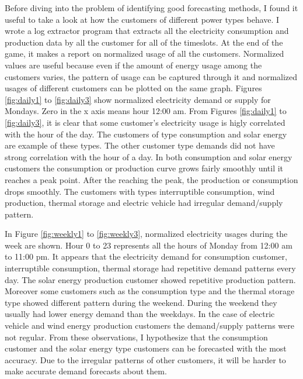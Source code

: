 Before diving into the problem of identifying good forecasting methods, I found it useful to take a look at how the customers of different power types behave. I wrote a log extractor program that extracts all the electricity consumption and production data by all the customer for all of the timeslots. At the end of the game, it makes a report on normalized usage of all the customers. Normalized values are useful because even if the amount of energy usage among the customers varies, the pattern of usage can be captured through it and normalized usages of different customers can be plotted on the same graph. Figures \ref{fig:daily1} to \ref{fig:daily3} show normalized electricity demand or supply for Mondays. Zero in the x axis means hour 12:00 am. From Figures \ref{fig:daily1} to \ref{fig:daily3}, it is clear that some customer's electricity usage is higly correlated with the hour of the day. The customers of type consumption and solar energy are example of these types. The other customer type demands did not have strong correlation with the hour of a day. In both consumption and solar energy customers the consumption or production curve grows fairly smoothly until it reaches a peak point. After the reaching the peak, the production or consumption drops smoothly. The customers with types interruptible consumption, wind production, thermal storage and electric vehicle had irregular demand/supply pattern. 

In Figure \ref{fig:weekly1} to \ref{fig:weekly3}, normalized electricity usages during the week are shown. Hour 0 to 23 represents all the hours of Monday from 12:00 am to 11:00 pm. It appears that the electricity demand for consumption customer, interruptible consumption, thermal storage had repetitive demand patterns every day. The  solar energy production customer showed repetitive production pattern. Moreover some customers such as the consumption type and the thermal storage type showed different pattern during the weekend. During the weekend they usually had lower energy demand than the weekdays. In the case of electric vehicle and wind energy production customers the demand/supply patterns were not regular. From these observations, I hypothesize that the consumption customer and the solar energy type customers can be forecasted with the most accuracy. Due to the irregular patterns of other customers, it will be harder to make accurate demand forecasts about them.
 

